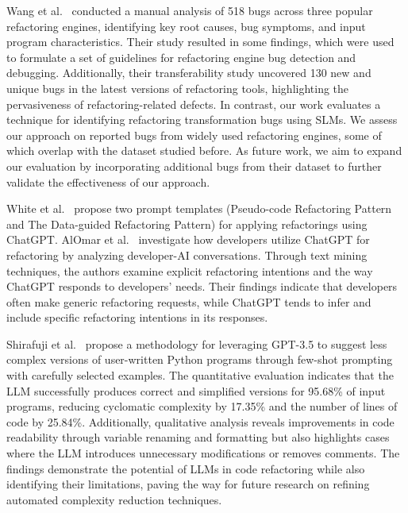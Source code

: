 Wang et al.~\cite{wang2024empiricalstudyrefactoringengine} conducted a manual analysis of 518 bugs across three popular refactoring engines, identifying key root causes, bug symptoms, and input program characteristics. Their study resulted in some findings, which were used to formulate a set of guidelines for refactoring engine bug detection and debugging. Additionally, their transferability study uncovered 130 new and unique bugs in the latest versions of refactoring tools, highlighting the pervasiveness of refactoring-related defects.
In contrast, our work evaluates a technique for identifying refactoring transformation bugs using SLMs. We assess our approach on \bugs{} reported bugs from widely used refactoring engines, some of which overlap with the dataset studied before. As future work, we aim to expand our evaluation by incorporating additional bugs from their dataset to further validate the effectiveness of our approach.

White et al.~\cite{white2023chatgptpromptpatternsimproving} propose two prompt templates (Pseudo-code Refactoring Pattern and The Data-guided Refactoring Pattern) for applying refactorings using ChatGPT.
AlOmar et al.~\cite{DBLP:conf/msr/AlOmarVMNO24} investigate how developers utilize ChatGPT for refactoring by analyzing developer-AI conversations. Through text mining techniques, the authors examine explicit refactoring intentions and the way ChatGPT responds to developers' needs. Their findings indicate that developers often make generic refactoring requests, while ChatGPT tends to infer and include specific refactoring intentions in its responses. 

Shirafuji et al.~\cite{DBLP:conf/apsec/ShirafujiOSMW23} propose a methodology for leveraging GPT-3.5 to suggest less complex versions of user-written Python programs through few-shot prompting with carefully selected examples. The quantitative evaluation indicates that the LLM successfully produces correct and simplified versions for 95.68\% of input programs, reducing cyclomatic complexity by 17.35\% and the number of lines of code by 25.84\%. Additionally, qualitative analysis reveals improvements in code readability through variable renaming and formatting but also highlights cases where the LLM introduces unnecessary modifications or removes comments. The findings demonstrate the potential of LLMs in code refactoring while also identifying their limitations, paving the way for future research on refining automated complexity reduction techniques.

